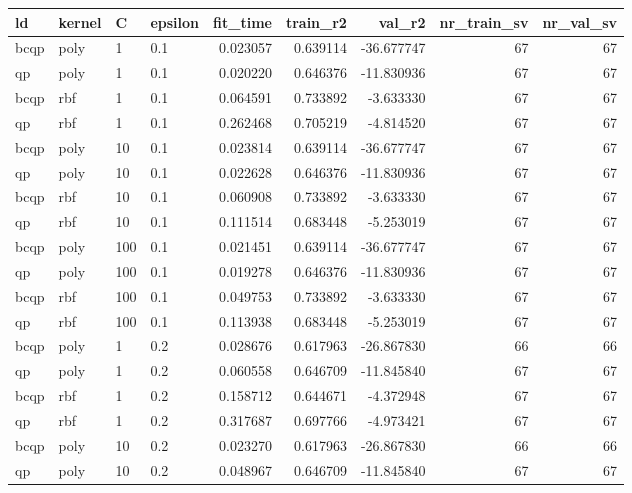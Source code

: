 \begin{tabular}{llllrrrrr}
\toprule
  ld & kernel &   C & epsilon &  fit\_time &  train\_r2 &     val\_r2 &  nr\_train\_sv &  nr\_val\_sv \\
\midrule
bcqp &   poly &   1 &     0.1 &  0.023057 &  0.639114 & -36.677747 &           67 &         67 \\
  qp &   poly &   1 &     0.1 &  0.020220 &  0.646376 & -11.830936 &           67 &         67 \\
bcqp &    rbf &   1 &     0.1 &  0.064591 &  0.733892 &  -3.633330 &           67 &         67 \\
  qp &    rbf &   1 &     0.1 &  0.262468 &  0.705219 &  -4.814520 &           67 &         67 \\
bcqp &   poly &  10 &     0.1 &  0.023814 &  0.639114 & -36.677747 &           67 &         67 \\
  qp &   poly &  10 &     0.1 &  0.022628 &  0.646376 & -11.830936 &           67 &         67 \\
bcqp &    rbf &  10 &     0.1 &  0.060908 &  0.733892 &  -3.633330 &           67 &         67 \\
  qp &    rbf &  10 &     0.1 &  0.111514 &  0.683448 &  -5.253019 &           67 &         67 \\
bcqp &   poly & 100 &     0.1 &  0.021451 &  0.639114 & -36.677747 &           67 &         67 \\
  qp &   poly & 100 &     0.1 &  0.019278 &  0.646376 & -11.830936 &           67 &         67 \\
bcqp &    rbf & 100 &     0.1 &  0.049753 &  0.733892 &  -3.633330 &           67 &         67 \\
  qp &    rbf & 100 &     0.1 &  0.113938 &  0.683448 &  -5.253019 &           67 &         67 \\
bcqp &   poly &   1 &     0.2 &  0.028676 &  0.617963 & -26.867830 &           66 &         66 \\
  qp &   poly &   1 &     0.2 &  0.060558 &  0.646709 & -11.845840 &           67 &         67 \\
bcqp &    rbf &   1 &     0.2 &  0.158712 &  0.644671 &  -4.372948 &           67 &         67 \\
  qp &    rbf &   1 &     0.2 &  0.317687 &  0.697766 &  -4.973421 &           67 &         67 \\
bcqp &   poly &  10 &     0.2 &  0.023270 &  0.617963 & -26.867830 &           66 &         66 \\
  qp &   poly &  10 &     0.2 &  0.048967 &  0.646709 & -11.845840 &           67 &         67 \\

\end{tabular}
